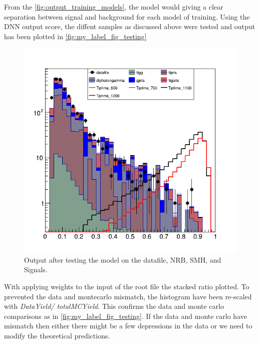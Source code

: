 From the \autoref{fig:output_training_models}, the model would giving a clear separation between signal and background for each model of training. Using the DNN output score, the diffent samples as discussed above were tested and output has been plotted in \autoref{fig:my_label_fig_testing}
\begin{figure}[H]
    \centering
    \includegraphics[scale=0.4]{Results_outputs/output_After_testing.png}
    \caption{Output after testing the model on the datafile, NRB, SMH, and Signals.}
    \label{fig:my_label_fig_testing}
\end{figure}



With applying weights to the input of the root file the stacked ratio plotted. To prevented the data and montecarlo mismatch, the histogram have been re-scaled with \textit{DataYield/ totalMCYield}.
 This confirms the data and monte carlo comparisons as in \autoref{fig:my_label_fig_testing}. If the data and monte carlo have mismatch then either there might be a few depressions in the data or we need to modify the theoretical predictions. 










\setcounter{equation}{0}
\setcounter{table}{0}
\setcounter{figure}{0}


    
           


 




 
 
